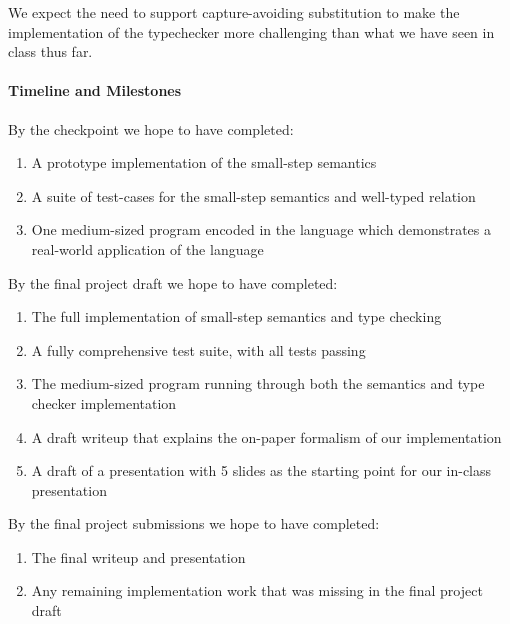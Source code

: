 \documentclass{article}
\begin{document}
We expect the need to support capture-avoiding substitution to make the
implementation of the typechecker more challenging than what we have seen in
class thus far.

\paragraph{Timeline and Milestones}

By the checkpoint we hope to have completed:
\begin{enumerate}
\item A prototype implementation of the small-step semantics
\item A suite of test-cases for the small-step semantics and well-typed relation
\item One medium-sized program encoded in the language which demonstrates a
  real-world application of the language
\end{enumerate}

\noindent
By the final project draft we hope to have completed:
\begin{enumerate}
\item The full implementation of small-step semantics and type checking
\item A fully comprehensive test suite, with all tests passing
\item The medium-sized program running through both the semantics and type
  checker implementation
\item A draft writeup that explains the on-paper formalism of our
  implementation
\item A draft of a presentation with 5 slides as the starting point for our
  in-class presentation
\end{enumerate}

\noindent
By the final project submissions we hope to have completed:
\begin{enumerate}
\item The final writeup and presentation
\item Any remaining implementation work that was missing in the final project
  draft
\end{enumerate}
\end{document}
